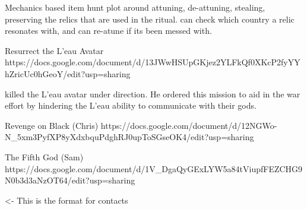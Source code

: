 \documentclass[char]{GL2020}
\begin{document}
Mechanics based item hunt plot around attuning, de-attuning, stealing, preserving the relics that are used in the ritual. \cAntiChup{} can check which country a relic resonates with, and can re-atune if its been messed with.

Resurrect the L'eau Avatar
https://docs.google.com/document/d/13JWwHSUpGKjez2YLFkQf0XKcP2fyYYhZricUc0hGeoY/edit?usp=sharing

\cScholarship{} killed the L'eau avatar under \cAntiChup{} direction. He ordered this mission to aid in the war effort by hindering the L'eau ability to communicate with their gods.

Revenge on Black (Chris)
https://docs.google.com/document/d/12NGWo-N_5xm3PyfXP8yXdxbquPdghRJ0upToSGseOK4/edit?usp=sharing

The Fifth God (Sam)
https://docs.google.com/document/d/1V_DgaQyGExLYW5a84tViupfFEZCHG9N0b3d3aNzOT64/edit?usp=sharing



\begin{itemz}[Goals]
	\item 
\end{itemz}

\begin{itemz}[Notes]
	\item 
\end{itemz}

\begin{contacts}
	\contact{\cTest{}} <- This is the format for contacts 
\end{contacts}
\end{document}
